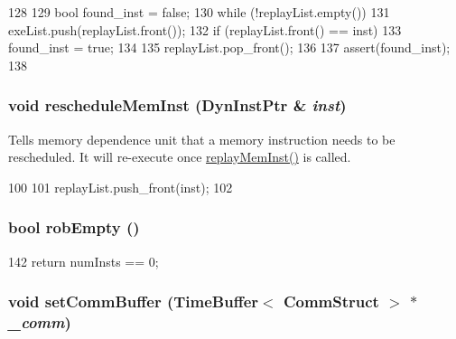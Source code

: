 \begin{DoxyCode}
128 {
129     bool found_inst = false;
130     while (!replayList.empty()) {
131         exeList.push(replayList.front());
132         if (replayList.front() == inst) {
133             found_inst = true;
134         }
135         replayList.pop_front();
136     }
137     assert(found_inst);
138 }
\end{DoxyCode}
\hypertarget{classLWBackEnd_aa9c46f45f491ef90a936c7e2b95f20aa}{
\subsubsection[{rescheduleMemInst}]{\setlength{\rightskip}{0pt plus 5cm}void rescheduleMemInst ({\bf DynInstPtr} \& {\em inst})}}
\label{classLWBackEnd_aa9c46f45f491ef90a936c7e2b95f20aa}
Tells memory dependence unit that a memory instruction needs to be rescheduled. It will re-\/execute once \hyperlink{classLWBackEnd_ae165df775b4de9e9430228c7f04c2bc9}{replayMemInst()} is called. 


\begin{DoxyCode}
100 {
101     replayList.push_front(inst);
102 }
\end{DoxyCode}
\hypertarget{classLWBackEnd_a5c38df1621043861ada4dd0939509869}{
\subsubsection[{robEmpty}]{\setlength{\rightskip}{0pt plus 5cm}bool robEmpty ()}}
\label{classLWBackEnd_a5c38df1621043861ada4dd0939509869}



\begin{DoxyCode}
142 { return numInsts == 0; }
\end{DoxyCode}
\hypertarget{classLWBackEnd_aeabdb9f0aae07df67c3029f8fddb2693}{
\subsubsection[{setCommBuffer}]{\setlength{\rightskip}{0pt plus 5cm}void setCommBuffer ({\bf TimeBuffer}$<$ {\bf CommStruct} $>$ $\ast$ {\em \_\-comm})}}
\label{classLWBackEnd_aeabdb9f0aae07df67c3029f8fddb2693}



